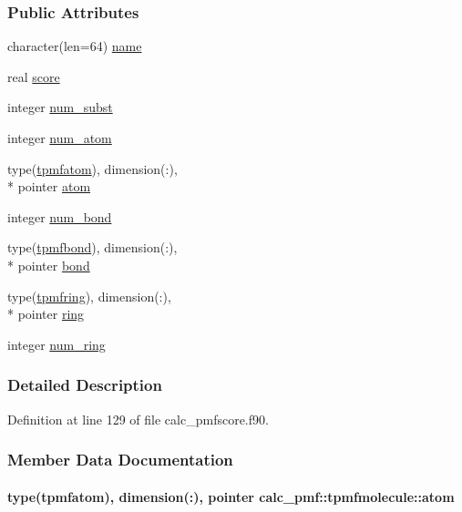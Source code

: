 \subsubsection*{Public Attributes}
\begin{DoxyCompactItemize}
\item 
character(len=64) \hyperlink{structcalc__pmf_1_1tpmfmolecule_a33ac887bdcf3e77747d22c54deae7d32}{name}
\item 
real \hyperlink{structcalc__pmf_1_1tpmfmolecule_a7dd9a97a6c26f2274b83db57dbe72959}{score}
\item 
integer \hyperlink{structcalc__pmf_1_1tpmfmolecule_abfce8e0b4581e25b14c515ecd1fd1f2d}{num\-\_\-subst}
\item 
integer \hyperlink{structcalc__pmf_1_1tpmfmolecule_aff70a81d959ec2f5fc4443b471a8de51}{num\-\_\-atom}
\item 
type(\hyperlink{structcalc__pmf_1_1tpmfatom}{tpmfatom}), dimension(\-:), \\*
pointer \hyperlink{structcalc__pmf_1_1tpmfmolecule_ac4860551c4eb104af9acb28704a4b5ff}{atom}
\item 
integer \hyperlink{structcalc__pmf_1_1tpmfmolecule_a3cb71e2ec827dedb9f45c9bfa5d434eb}{num\-\_\-bond}
\item 
type(\hyperlink{structcalc__pmf_1_1tpmfbond}{tpmfbond}), dimension(\-:), \\*
pointer \hyperlink{structcalc__pmf_1_1tpmfmolecule_aa3588cae0c81e558dc6f3ba3bc5ac875}{bond}
\item 
type(\hyperlink{structcalc__pmf_1_1tpmfring}{tpmfring}), dimension(\-:), \\*
pointer \hyperlink{structcalc__pmf_1_1tpmfmolecule_a25e7120480983ec1f014797fcb3d30af}{ring}
\item 
integer \hyperlink{structcalc__pmf_1_1tpmfmolecule_a7e54abada41932601b8767941b203339}{num\-\_\-ring}
\end{DoxyCompactItemize}


\subsubsection{Detailed Description}


Definition at line 129 of file calc\-\_\-pmfscore.\-f90.



\subsubsection{Member Data Documentation}
\hypertarget{structcalc__pmf_1_1tpmfmolecule_ac4860551c4eb104af9acb28704a4b5ff}{
\paragraph[{atom}]{\setlength{\rightskip}{0pt plus 5cm}type({\bf tpmfatom}), dimension(\-:), pointer calc\-\_\-pmf\-::tpmfmolecule\-::atom}}\label{structcalc__pmf_1_1tpmfmolecule_ac4860551c4eb104af9acb28704a4b5ff}


